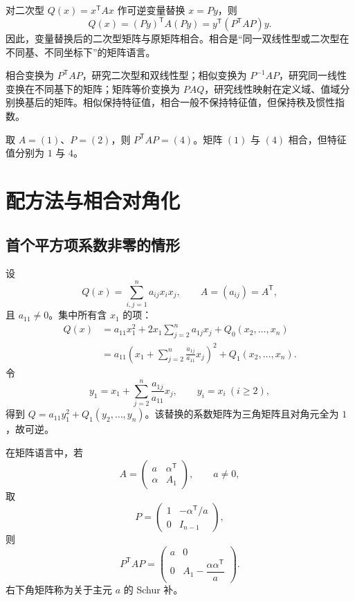 对二次型 $Q(x)=x^{\mathsf T}Ax$ 作可逆变量替换 $x=Py$，则
\[
Q(x)=(Py)^{\mathsf T}A(Py)=y^{\mathsf T}(P^{\mathsf T}AP)y.
\]
因此，变量替换后的二次型矩阵与原矩阵相合。相合是“同一双线性型或二次型在不同基、不同坐标下”的矩阵语言。

\begin{summary}[相合、相似与等价的区别]
相合变换为 $P^{\mathsf T}AP$，研究二次型和双线性型；相似变换为 $P^{-1}AP$，研究同一线性变换在不同基下的矩阵；矩阵等价变换为 $PAQ$，研究线性映射在定义域、值域分别换基后的矩阵。相似保持特征值，相合一般不保持特征值，但保持秩及惯性指数。
\end{summary}

\begin{example}[title={相合不保持特征值}]
取 $A=(1)$、$P=(2)$，则 $P^{\mathsf T}AP=(4)$。矩阵 $(1)$ 与 $(4)$ 相合，但特征值分别为 $1$ 与 $4$。
\end{example}

\section{配方法与相合对角化}

\subsection{首个平方项系数非零的情形}

设
\[
Q(x)=\sum_{i,j=1}^n a_{ij}x_ix_j,\qquad A=(a_{ij})=A^{\mathsf T},
\]
且 $a_{11}\ne0$。集中所有含 $x_1$ 的项：
\begin{align*}
Q(x)
&=a_{11}x_1^2+2x_1\sum_{j=2}^n a_{1j}x_j+Q_0(x_2,\ldots,x_n)\\
&=a_{11}\left(x_1+\sum_{j=2}^n\frac{a_{1j}}{a_{11}}x_j\right)^2
+Q_1(x_2,\ldots,x_n).
\end{align*}
令
\[
y_1=x_1+\sum_{j=2}^n\frac{a_{1j}}{a_{11}}x_j,\qquad y_i=x_i\ (i\ge2),
\]
得到 $Q=a_{11}y_1^2+Q_1(y_2,\ldots,y_n)$。该替换的系数矩阵为三角矩阵且对角元全为 $1$，故可逆。

在矩阵语言中，若
\[
A=\begin{pmatrix}a&\alpha^{\mathsf T}\\\alpha&A_1\end{pmatrix},\qquad a\ne0,
\]
取
\[
P=\begin{pmatrix}1&-\alpha^{\mathsf T}/a\\0&I_{n-1}\end{pmatrix},
\]
则
\[
P^{\mathsf T}AP=
\begin{pmatrix}
a&0\\
0&A_1-\dfrac{\alpha\alpha^{\mathsf T}}a
\end{pmatrix}.
\]
右下角矩阵称为关于主元 $a$ 的 Schur 补。

